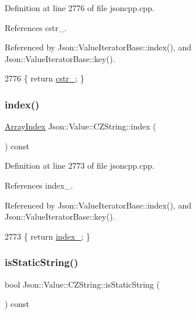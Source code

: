 Definition at line 2776 of file jsoncpp.\+cpp.



References cstr\+\_\+.



Referenced by Json\+::\+Value\+Iterator\+Base\+::index(), and Json\+::\+Value\+Iterator\+Base\+::key().


\begin{DoxyCode}
2776 \{ \textcolor{keywordflow}{return} \hyperlink{class_json_1_1_value_1_1_c_z_string_a5b4d28349294034d7f779c3c95d0306c}{cstr\_}; \}
\end{DoxyCode}
\mbox{\label{class_json_1_1_value_1_1_c_z_string_a0f3ba09401525d4f01dafd577122ee32}} 
\subsubsection{\texorpdfstring{index()}{index()}}
{\footnotesize\ttfamily \hyperlink{class_json_1_1_value_a184a91566cccca7b819240f0d5561c7d}{Array\+Index} Json\+::\+Value\+::\+C\+Z\+String\+::index (\begin{DoxyParamCaption}{ }\end{DoxyParamCaption}) const}



Definition at line 2773 of file jsoncpp.\+cpp.



References index\+\_\+.



Referenced by Json\+::\+Value\+Iterator\+Base\+::index(), and Json\+::\+Value\+Iterator\+Base\+::key().


\begin{DoxyCode}
2773 \{ \textcolor{keywordflow}{return} \hyperlink{class_json_1_1_value_1_1_c_z_string_aecf29982235c9c165a0971023ebbb270}{index\_}; \}
\end{DoxyCode}
\mbox{\label{class_json_1_1_value_1_1_c_z_string_a5991dfa2f6c2ba318373c7429fcd7a57}} 
\subsubsection{\texorpdfstring{is\+Static\+String()}{isStaticString()}}
{\footnotesize\ttfamily bool Json\+::\+Value\+::\+C\+Z\+String\+::is\+Static\+String (\begin{DoxyParamCaption}{ }\end{DoxyParamCaption}) const}



